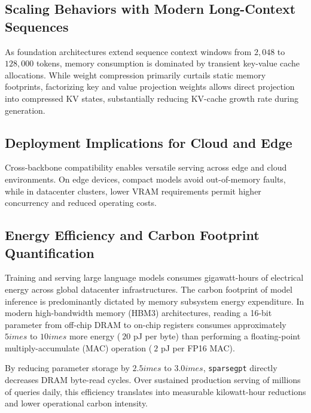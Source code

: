 \subsection{Scaling Behaviors with Modern Long-Context Sequences}
As foundation architectures extend sequence context windows from $2{,}048$ to $128{,}000$ tokens, memory consumption is dominated by transient key-value cache allocations. While weight compression primarily curtails static memory footprints, factorizing key and value projection weights allows direct projection into compressed KV states, substantially reducing KV-cache growth rate during generation.

\subsection{Deployment Implications for Cloud and Edge}
Cross-backbone compatibility enables versatile serving across edge and cloud environments. On edge devices, compact models avoid out-of-memory faults, while in datacenter clusters, lower VRAM requirements permit higher concurrency and reduced operating costs.

\subsection{Energy Efficiency and Carbon Footprint Quantification}
Training and serving large language models consumes gigawatt-hours of electrical energy across global datacenter infrastructures. The carbon footprint of model inference is predominantly dictated by memory subsystem energy expenditure. In modern high-bandwidth memory (HBM3) architectures, reading a 16-bit parameter from off-chip DRAM to on-chip registers consumes approximately $5	imes$ to $10	imes$ more energy ($~20$ pJ per byte) than performing a floating-point multiply-accumulate (MAC) operation ($~2$ pJ per FP16 MAC).

By reducing parameter storage by $2.5	imes$ to $3.0	imes$, \texttt{sparsegpt} directly decreases DRAM byte-read cycles. Over sustained production serving of millions of queries daily, this efficiency translates into measurable kilowatt-hour reductions and lower operational carbon intensity.

